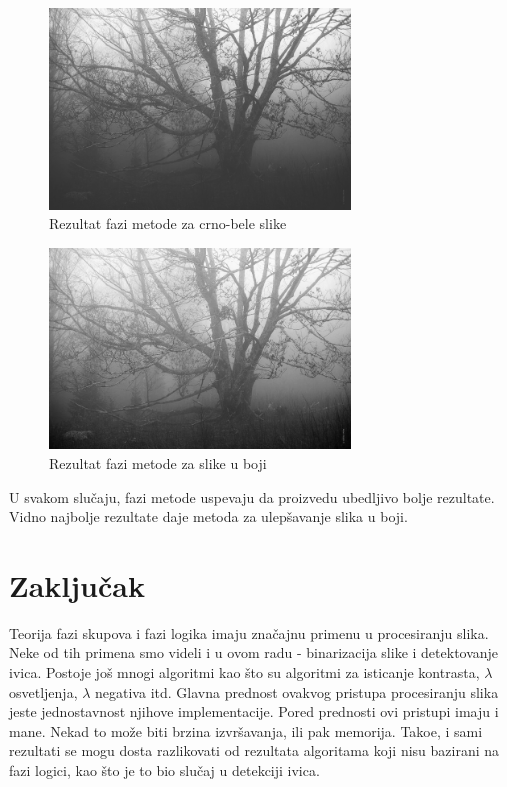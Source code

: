 \documentclass[12pt,a4paper]{article}
\theoremstyle{definition}
\theoremstyle{remark}
\theoremstyle{plain}
\begin{document}
\begin{multicols}{2}
\begin{figure}[H]
\centering
\includegraphics[width=8cm]{images/fuzzy_grayscale_0.jpg}
  \caption{Rezultat fazi metode za crno-bele slike}\label{river2}
\end{figure}
\columnbreak
\begin{figure}[H]
\centering
\includegraphics[width=8cm]{images/fuzzy_color_3.jpg}
  \caption{Rezultat fazi metode za slike u boji}\label{river_output3}
\end{figure}
\end{multicols}

U svakom slu\v caju, fazi metode uspevaju da proizvedu ubedljivo bolje rezultate. \\
Vidno najbolje rezultate daje metoda za ulep\v savanje slika u boji. 



\newpage
\section{Zaklju\v cak}
Teorija fazi skupova i fazi logika imaju zna\v cajnu primenu u procesiranju slika. Neke od tih primena smo videli i u ovom radu - binarizacija slike i detektovanje ivica. Postoje jo\v s mnogi algoritmi kao \v sto su algoritmi za isticanje kontrasta, $\lambda$ osvetljenja, $\lambda$ negativa itd.  Glavna prednost ovakvog pristupa procesiranju slika jeste jednostavnost njihove implementacije. Pored prednosti ovi pristupi imaju i mane. Nekad to mo\v ze biti brzina izvr\v savanja, ili pak memorija. Tako\dj e, i sami rezultati se mogu dosta razlikovati od rezultata algoritama koji nisu bazirani na fazi logici, kao \v sto je to bio slu\v caj u detekciji ivica.
\end{document}
